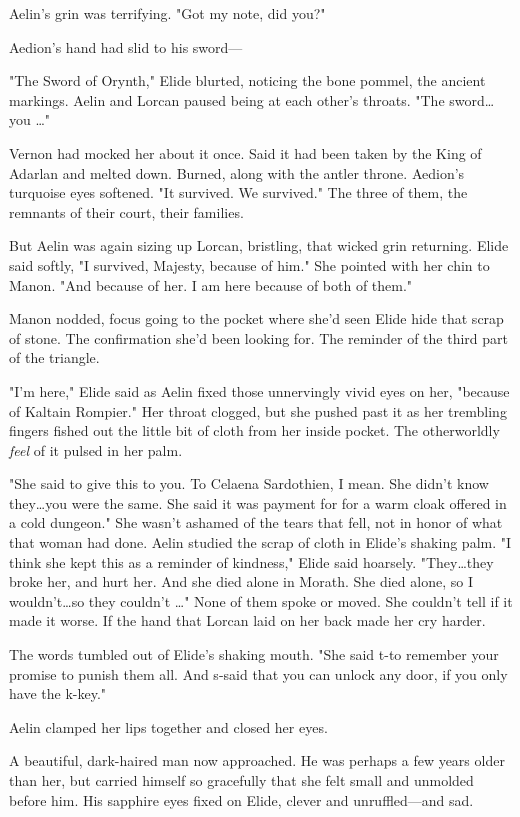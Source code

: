 Aelin's grin was terrifying.
"Got my note, did you?"

Aedion's hand had slid to his sword---

"The Sword of Orynth," Elide blurted, noticing the bone pommel, the ancient markings.
Aelin and Lorcan paused being at each other's throats.
"The sword\ldots you \ldots"

Vernon had mocked her about it once.
Said it had been taken by the King of Adarlan and melted down.
Burned, along with the antler throne.
Aedion's turquoise eyes softened.
"It survived.
We survived."
The three of them, the remnants of their court, their families.

But Aelin was again sizing up Lorcan, bristling, that wicked grin returning.
Elide said softly, "I survived, Majesty, because of him."
She pointed with her chin to Manon.
"And because of her.
I am here because of both of them."

Manon nodded, focus going to the pocket where she'd seen Elide hide that scrap of stone.
The confirmation she'd been looking for.
The reminder of the third part of the triangle.

"I'm here," Elide said as Aelin fixed those unnervingly vivid eyes on her, "because of Kaltain Rompier."
Her throat clogged, but she pushed past it as her trembling fingers fished out the little bit of cloth from her inside pocket.
The otherworldly \emph{feel} of it pulsed in her palm.

"She said to give this to you.
To Celaena Sardothien, I mean.
She didn't know they\ldots you were the same.
She said it was payment for  for a warm cloak offered in a cold dungeon."
She wasn't ashamed of the tears that fell, not in honor of what that woman had done.
Aelin studied the scrap of cloth in Elide's shaking palm.
"I think she kept this as a reminder of kindness," Elide said hoarsely.
"They\ldots they broke her, and hurt her.
And she died alone in Morath.
She died alone, so I wouldn't\ldots so they couldn't \ldots" None of them spoke or moved.
She couldn't tell if it made it worse.
If the hand that Lorcan laid on her back made her cry harder.

The words tumbled out of Elide's shaking mouth.
"She said t-to remember your promise to punish them all.
And s-said that you can unlock any door, if you only have the k-key."

Aelin clamped her lips together and closed her eyes.

A beautiful, dark-haired man now approached.
He was perhaps a few years older than her, but carried himself so gracefully that she felt small and unmolded before him.
His sapphire eyes fixed on Elide, clever and unruffled---and sad.

